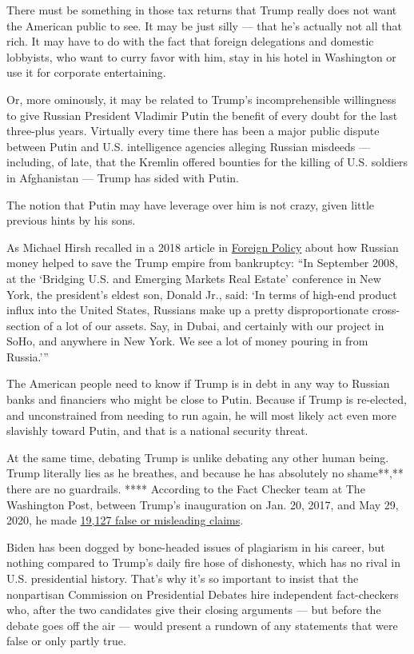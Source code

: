 There must be something in those tax returns that Trump really does not
want the American public to see. It may be just silly --- that he's
actually not all that rich. It may have to do with the fact that foreign
delegations and domestic lobbyists, who want to curry favor with him,
stay in his hotel in Washington or use it for corporate entertaining.

Or, more ominously, it may be related to Trump's incomprehensible
willingness to give Russian President Vladimir Putin the benefit of
every doubt for the last three-plus years. Virtually every time there
has been a major public dispute between Putin and U.S. intelligence
agencies alleging Russian misdeeds --- including, of late, that the
Kremlin offered bounties for the killing of U.S. soldiers in Afghanistan
--- Trump has sided with Putin.

The notion that Putin may have leverage over him is not crazy, given
little previous hints by his sons.

As Michael Hirsh recalled in a 2018 article in
\href{https://foreignpolicy.com/2018/12/21/how-russian-money-helped-save-trumps-business/}{Foreign
Policy} about how Russian money helped to save the Trump empire from
bankruptcy: ``In September 2008, at the `Bridging U.S. and Emerging
Markets Real Estate' conference in New York, the president's eldest son,
Donald Jr., said: `In terms of high-end product influx into the United
States, Russians make up a pretty disproportionate cross-section of a
lot of our assets. Say, in Dubai, and certainly with our project in
SoHo, and anywhere in New York. We see a lot of money pouring in from
Russia.'''

The American people need to know if Trump is in debt in any way to
Russian banks and financiers who might be close to Putin. Because if
Trump is re-elected, and unconstrained from needing to run again, he
will most likely act even more slavishly toward Putin, and that is a
national security threat.

At the same time, debating Trump is unlike debating any other human
being. Trump literally lies as he breathes, and because he has
absolutely no shame**,** there are no guardrails. **** According to the
Fact Checker team at The Washington Post, between Trump's inauguration
on Jan. 20, 2017, and May 29, 2020, he made
\href{https://www.washingtonpost.com/politics/2020/06/01/president-trump-made-19127-false-or-misleading-claims-1226-days/}{19,127
false or misleading claims}.

Biden has been dogged by bone-headed issues of plagiarism in his career,
but nothing compared to Trump's daily fire hose of dishonesty, which has
no rival in U.S. presidential history. That's why it's so important to
insist that the nonpartisan Commission on Presidential Debates hire
independent fact-checkers who, after the two candidates give their
closing arguments --- but before the debate goes off the air --- would
present a rundown of any statements that were false or only partly true.


